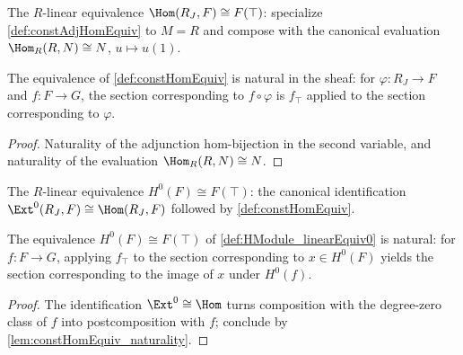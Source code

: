 \begin{definition}
  \label{def:constHomEquiv}
  \leanok
  The \(R\)-linear equivalence
  \(\Hom(R_J, F) \cong F(\top)\): specialize \ref{def:constAdjHomEquiv} to \(M = R\) and
  compose with the canonical evaluation \(\Hom_R(R, N) \cong N\), \(u \mapsto u(1)\).
\end{definition}

\begin{lemma}[Naturality]
  \label{lem:constHomEquiv_naturality}
  \leanok
  The equivalence of \ref{def:constHomEquiv} is natural in the sheaf: for
  \(\varphi : R_J \to F\) and \(f : F \to G\), the section corresponding to
  \(f \circ \varphi\) is \(f_\top\) applied to the section corresponding to \(\varphi\).
\end{lemma}
\begin{proof}
  \leanok
  Naturality of the adjunction hom-bijection in the second variable, and naturality of the
  evaluation \(\Hom_R(R, N) \cong N\).
\end{proof}

\begin{definition}
  \label{def:HModule_linearEquiv0}
  \leanok
  The \(R\)-linear equivalence \(H^0(F) \cong F(\top)\): the canonical identification
  \(\Ext^0(R_J, F) \cong \Hom(R_J, F)\) followed by \ref{def:constHomEquiv}.
\end{definition}

\begin{lemma}
  \label{lem:HModule_linearEquiv0_naturality}
  \leanok
  The equivalence \(H^0(F) \cong F(\top)\) of \ref{def:HModule_linearEquiv0} is natural: for
  \(f : F \to G\), applying \(f_\top\) to the section corresponding to \(x \in H^0(F)\)
  yields the section corresponding to the image of \(x\) under \(H^0(f)\).
\end{lemma}
\begin{proof}
  \leanok
  The identification \(\Ext^0 \cong \Hom\) turns composition with the degree-zero class of
  \(f\) into postcomposition with \(f\); conclude by \ref{lem:constHomEquiv_naturality}.
\end{proof}

